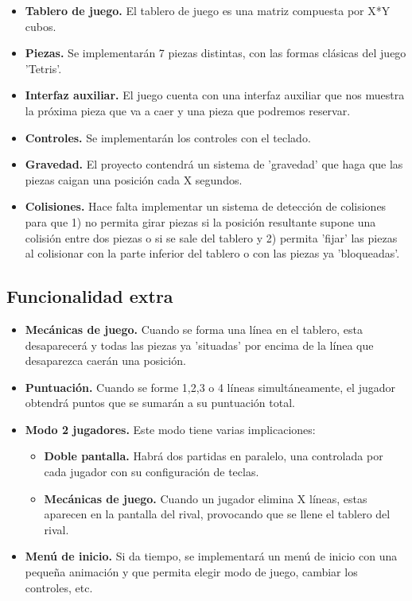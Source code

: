 \documentclass[11pt,a4paper]{article}
\begin{document}
\begin{itemize}
    \item \textbf{Tablero de juego.} El tablero de juego es una matriz compuesta por X*Y cubos. 
    \item \textbf{Piezas.} Se implementarán 7 piezas distintas, con las formas clásicas del juego 'Tetris'.
    \item \textbf{Interfaz auxiliar.} El juego cuenta con una interfaz auxiliar que nos muestra la próxima pieza que va a caer y una pieza que podremos reservar.
    \item \textbf{Controles.} Se implementarán los controles con el teclado.
    \item \textbf{Gravedad.} El proyecto contendrá un sistema de 'gravedad' que haga que las piezas caigan una posición cada X segundos.
    \item \textbf{Colisiones.} Hace falta implementar un sistema de detección de colisiones para que 1) no permita girar piezas si la posición resultante supone una colisión entre dos piezas o si se sale del tablero y 2) permita 'fijar' las piezas al colisionar con la parte inferior del tablero o con las piezas ya 'bloqueadas'.
\end{itemize}

\subsection{Funcionalidad extra}

\begin{itemize}
    \item \textbf{Mecánicas de juego.} Cuando se forma una línea en el tablero, esta desaparecerá y todas las piezas ya 'situadas' por encima de la línea que desaparezca caerán una posición.
    \item \textbf{Puntuación.} Cuando se forme 1,2,3 o 4 líneas simultáneamente, el jugador obtendrá puntos que se sumarán a su puntuación total.
    \item \textbf{Modo 2 jugadores.} Este modo tiene varias implicaciones:
        \begin{itemize}
            \item \textbf{Doble pantalla.} Habrá dos partidas en paralelo, una controlada por cada jugador con su configuración de teclas.
            \item \textbf{Mecánicas de juego.} Cuando un jugador elimina X líneas, estas aparecen en la pantalla del rival, provocando que se llene el tablero del rival.
        \end{itemize}
    \item \textbf{Menú de inicio.} Si da tiempo, se implementará un menú de inicio con una pequeña animación y que permita elegir modo de juego, cambiar los controles, etc.
\end{itemize}
\end{document}
